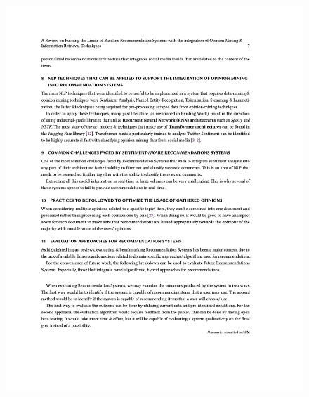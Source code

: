 \begin{figure}[h!]
\centering
\includegraphics[width=\textwidth]{images/appendix/papers/review/A Review on Pushing the Limits of Baseline Recommendation Systems with the integration of Opinion Mining & Information Retrieval Techniques 7.jpeg}
\end{figure}

